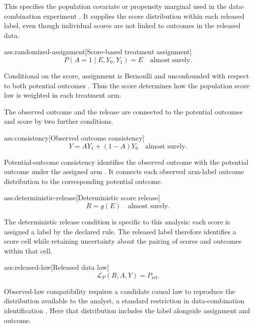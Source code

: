 \documentclass[11pt]{article}
\begin{document}
This specifies the population covariate or propensity marginal used in the data-combination experiment \citep{FanShermanShum2014}. It supplies the score distribution within each released label, even though individual scores are not linked to outcomes in the released data.

\begin{assumptionv}{ass:randomized-assignment}[Score-based treatment assignment]
\[
P(A=1\mid E,Y_0,Y_1)=E
\quad\text{almost surely}.
\]
\end{assumptionv}

Conditional on the score, assignment is Bernoulli and unconfounded with respect to both potential outcomes \citep{FanShermanShum2014}. Thus the score determines how the population score law is weighted in each treatment arm.

The observed outcome and the release are connected to the potential outcomes and score by two further conditions.

\begin{assumptionv}{ass:consistency}[Observed outcome consistency]
\[
Y=AY_1+(1-A)Y_0
\quad\text{almost surely}.
\]
\end{assumptionv}

Potential-outcome consistency identifies the observed outcome with the potential outcome under the assigned arm \citep{Rubin1974}. It connects each observed arm-label outcome distribution to the corresponding potential outcome.

\begin{assumptionv}{ass:deterministic-release}[Deterministic score release]
\[
R=g(E)
\quad\text{almost surely}.
\]
\end{assumptionv}

The deterministic release condition is specific to this analysis: each score is assigned a label by the declared rule. The released label therefore identifies a score cell while retaining uncertainty about the pairing of scores and outcomes within that cell.

\begin{assumptionv}{ass:released-law}[Released data law]
\[
\mathcal L_P(R,A,Y)=P_{\mathrm{rel}}.
\]
\end{assumptionv}

Observed-law compatibility requires a candidate causal law to reproduce the distribution available to the analyst, a standard restriction in data-combination identification \citep{FanShermanShum2014}. Here that distribution includes the label alongside assignment and outcome.
\end{document}
